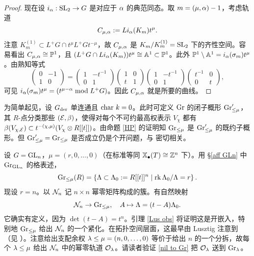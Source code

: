 \begin{proof}
现在设 $i_{\alpha}: {\operatorname{SL}}_2\to G$ 是对应于 ${\alpha}$ 的典范同态。取 $m=(\mu,{\alpha})-1$，考虑轨道
\begin{equation}\label{curve C}
C_{\mu,{\alpha}}:=Li_{\alpha}(K_{m})t^\mu.
\end{equation}
注意 $K_{m}^{(1)}\subset L^+G\cap t^\mu L^+G t^{-\mu}$，故 $C_{\mu,{\alpha}}$ 是 $K_{m}/K_m^{(1)}={\operatorname{SL}}_2$ 下的齐性空间。容易看出 $C_{\mu,{\alpha}}\cong {\mathbb P}^1$，且 $(L^+G\cap Li_{\alpha}(K_m))t^\mu\cong {\mathbb A}^1\subset {\mathbb P}^1$。此外 ${\mathbb P}^1\setminus{\mathbb A}^1=i_{\alpha}(\sigma_m)t^\mu$。由熟知等式
\[\begin{pmatrix}0&-1\\1&0\end{pmatrix}=\begin{pmatrix}1&-t^{-1}\\0&1\end{pmatrix}\begin{pmatrix}1&0\\ t&1\end{pmatrix}\begin{pmatrix}1&-t^{-1}\\0&1\end{pmatrix}\begin{pmatrix}t^{-1}&0\\0&t\end{pmatrix},\]
可见 $i_{{\alpha}}(\sigma_m)t^\mu=(t^{\mu-{\alpha}} \bmod L^+G)$。因此 $C_{\mu,{\alpha}}$ 就是所要的曲线。
\end{proof}

\begin{rmk}
为简单起见，设 $G_{\operatorname{der}}$ 单连通且 ${\operatorname{char}}\ k=0$。此时可定义 ${\operatorname{Gr}}$ 的闭子概形 ${\operatorname{Gr}}'_{\leq \mu}$，其 $R$-点分类那些 $({\mathcal E},\beta)$，使得对每个不可约最高权表示 $V_\chi$ 都有 $\beta(V_{\chi,{\mathcal E}})\subset t^{-(\chi,\mu)}(V_{\chi}\otimes R[[t]])$。由命题 \ref{HP} 的证明知 ${\operatorname{Gr}}_{\leq \mu}$ 是 ${\operatorname{Gr}}'_{\leq \mu}$ 的既约子概形。但 ${\operatorname{Gr}}'_{\leq \mu}={\operatorname{Gr}}_{\leq \mu}$ 是否成立仍是个开问题，与 \cite[Conjecture 2.14, Conjecture 2.20]{KWWY} 密切相关。
\end{rmk}

\begin{ex}\label{momega1}
设 $G={\operatorname{GL}}_n$，$\mu=(r,0,\ldots,0)$（在标准等同 $\mathbb{X}_\bullet(T)\cong {\mathbb Z}^n$ 下）。用 \S\ref{aff GLn} 中 ${\operatorname{Gr}}_{{\operatorname{GL}}_n}$ 的格表述，
\[{\operatorname{Gr}}_{\leq \mu}(R)=\left\{ \Lambda\subset \Lambda_0:=R[[t]]^n\mid \operatorname{rk} \Lambda_0/\Lambda=r\right\}.\]
现设 $r=n$。以 ${\mathcal N}_n$ 记 $n\times n$ 幂零矩阵构成的簇。有自然映射
\begin{equation}\label{nil to Gr}
{\mathcal N}_n\to {\operatorname{Gr}}_{\leq \mu},\quad A\mapsto {\Lambda}=(t-A){\Lambda}_0.
\end{equation}
它确实有定义，因为 $\det(t-A)=t^n$。引理 \ref{Lus obs} 将证明这是开嵌入，特别地 ${\operatorname{Gr}}_{\leq \mu}$ 给出 ${\mathcal N}_n$ 的一个紧化。在拓扑空间层面，这最早由 Lusztig 注意到（见 \cite{Lu0}）。注意给出支配余权 ${\lambda}\leq \mu=(n,0,\ldots,0)$ 等价于给出 $n$ 的一个分拆，故每个 ${\lambda}\leq \mu$ 给出 ${\mathcal N}_n$ 中的幂零轨道 ${\mathcal O}_{\lambda}$。请读者验证 \eqref{nil to Gr} 把 ${\mathcal O}_{\lambda}$ 送到 ${\operatorname{Gr}}_{\lambda}$。
\end{ex}

